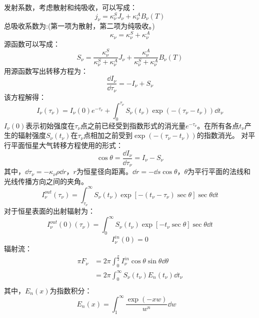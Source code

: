 发射系数，考虑散射和纯吸收，可以写成：
\begin{equation}
	j_{\nu}=\kappa_{\nu}^{S}J_{\nu}+\kappa_{\nu}^{A}B_{\nu}(T)
\end{equation}
总吸收系数为:(第一项为散射，第二项为纯吸收。)
\begin{equation}
	\kappa_{\nu}=\kappa_{\nu}^{S}+\kappa_{\nu}^{A}
\end{equation}
源函数可以写成：
\begin{equation}
	S_{\nu}=\frac{\kappa_{\nu}^{S}}{\kappa_{\nu}^{S}+\kappa_{\nu}^{A}}J_{\nu}+\frac{\kappa_{\nu}^{A}}{\kappa_{\nu}^{S}+\kappa_{\nu}^{A}}B_{\nu}(T)
\end{equation}
用源函数写出转移方程为：
\begin{equation}
	\frac{\dd I_{\nu}}{\dd \tau_{\nu}}=-I_{\nu}+S_{\nu}
\end{equation}
该方程解得：
\begin{equation}
	I_{\nu}(\tau_{\nu})=I_{\nu}(0)e^{-\tau_{\nu}}+\int_{0}^{\tau_{\nu}}S_{\nu}(t_{\nu})\exp(-(\tau_{\nu}-t_{\nu}))\dd t_{\nu}
\end{equation}
$I_{\nu}(0)$表示初始强度在$\tau_{\nu}$点之前已经受到指数形式的消光量$e^{-\tau_{\nu}}$。在所有各点$t_{\nu}$产生的辐射强度$S_{\nu}(t_{\nu})$在$\tau_{\nu}$点相加之前受到$\exp(-(\tau_{\nu}-t_{\nu}))$的指数消光。
对平行平面恒星大气转移方程使用的形式：
\begin{equation}
	\cos \theta =\frac{\dd I_{\nu}}{\dd \tau_{\nu}}=I_{\nu}-S_{\nu}
\end{equation}
其中，$\dd \tau_{\nu}=-\kappa_{\nu}\rho \dd r$，$r$为恒星径向距离。$\dd r=-\dd s\cos \theta$，$\theta$为平行平面的法线和光线传播方向之间的夹角。
\begin{equation}
	I_{\nu}^{out}(\tau_{\nu})=\int_{\tau_{\nu}}^{\infty}S_{\nu}(t_{\nu})\exp[-(t_{\nu}-\tau_{\nu})\sec\theta]\sec\theta\dd t
\end{equation}
对于恒星表面的出射辐射为：
\begin{equation}
	I_{\nu}^{out}(0)(\tau_{\nu})=\int_{0}^{\infty}S_{\nu}(t_{\nu})\exp[-t_{\nu}\sec\theta]\sec\theta\dd t
\end{equation}
\begin{equation}
	I_{\nu}^{in}(0)=0
\end{equation}
辐射流：
\begin{equation}
	\begin{split}
		\pi F_{\nu}&=2\pi \int_{0}^{\frac{\pi}{2}}I_{\nu}^{in}\cos \theta \sin\theta\dd \theta\\
		&=2\pi \int_{0}^{\infty}S_{\nu}(t_{\nu})E_{n}(t_{\nu})\dd t_{\nu}\\
	\end{split}
\end{equation}
其中，$E_{n}(x)$为指数积分：
\begin{equation}
	E_{n}(x)=\int_{1}^{\infty}\frac{\exp(-xw)}{w^n}\dd w\quad
\end{equation}
